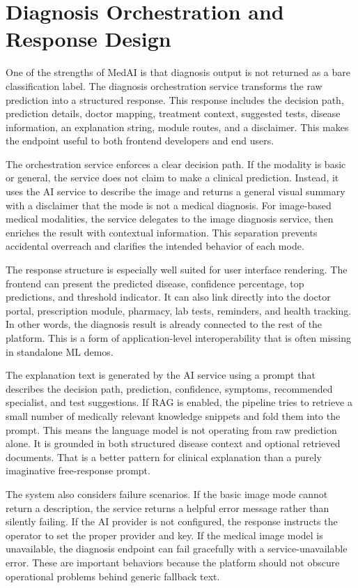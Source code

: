 \documentclass[conference]{IEEEtran}
\begin{document}
\section{Diagnosis Orchestration and Response Design}
One of the strengths of MedAI is that diagnosis output is not returned as a bare classification label. The diagnosis orchestration service transforms the raw prediction into a structured response. This response includes the decision path, prediction details, doctor mapping, treatment context, suggested tests, disease information, an explanation string, module routes, and a disclaimer. This makes the endpoint useful to both frontend developers and end users.

The orchestration service enforces a clear decision path. If the modality is basic or general, the service does not claim to make a clinical prediction. Instead, it uses the AI service to describe the image and returns a general visual summary with a disclaimer that the mode is not a medical diagnosis. For image-based medical modalities, the service delegates to the image diagnosis service, then enriches the result with contextual information. This separation prevents accidental overreach and clarifies the intended behavior of each mode.

The response structure is especially well suited for user interface rendering. The frontend can present the predicted disease, confidence percentage, top predictions, and threshold indicator. It can also link directly into the doctor portal, prescription module, pharmacy, lab tests, reminders, and health tracking. In other words, the diagnosis result is already connected to the rest of the platform. This is a form of application-level interoperability that is often missing in standalone ML demos.

The explanation text is generated by the AI service using a prompt that describes the decision path, prediction, confidence, symptoms, recommended specialist, and test suggestions. If RAG is enabled, the pipeline tries to retrieve a small number of medically relevant knowledge snippets and fold them into the prompt. This means the language model is not operating from raw prediction alone. It is grounded in both structured disease context and optional retrieved documents. That is a better pattern for clinical explanation than a purely imaginative free-response prompt.

The system also considers failure scenarios. If the basic image mode cannot return a description, the service returns a helpful error message rather than silently failing. If the AI provider is not configured, the response instructs the operator to set the proper provider and key. If the medical image model is unavailable, the diagnosis endpoint can fail gracefully with a service-unavailable error. These are important behaviors because the platform should not obscure operational problems behind generic fallback text.
\end{document}
